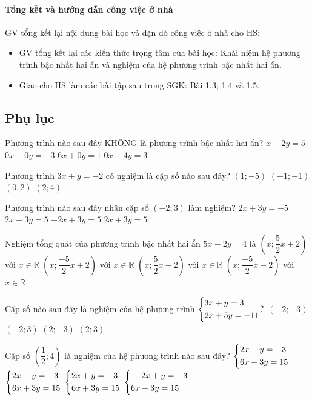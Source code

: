 \paragraph{Tổng kết và hướng dẫn công việc ở nhà}

GV tổng kết lại nội dung bài học và dặn dò công việc ở nhà cho HS:

\begin{itemize}
    \item GV tổng kết lại các kiến thức trọng tâm của bài học: Khái niệm hệ phương trình bậc nhất hai ẩn và nghiệm của hệ phương trình bậc nhất hai ẩn. 
    \item Giao cho HS làm các bài tập sau trong SGK: Bài 1.3; 1.4 và 1.5. 
\end{itemize}

\subsection{Phụ lục}

\begin{ex}
    Phương trình nào sau đây KHÔNG là phương trình bậc nhất hai ẩn?
    \choice
    {$x - 2y = 5$}
    {$0x + 0y = -3$}
    {$6x + 0y = 1$}
    {$0x - 4y = 3$}
\end{ex}

\begin{ex}
    Phương trình $3x + y = -2$ có nghiệm là cặp số nào sau đây?
    \choice
    {$(1; -5)$}
    {$(-1; -1)$}
    {$(0; 2)$}
    {$(2; 4)$}
\end{ex}

\begin{ex}
    Phương trình nào sau đây nhận cặp số $(-2; 3)$ làm nghiệm?
    \choice
    {$2x + 3y = -5$}
    {$2x - 3y = 5$}
    {$-2x + 3y = 5$}
    {$2x + 3y = 5$}
\end{ex}

\begin{ex}
    Nghiệm tổng quát của phương trình bậc nhất hai ẩn $5x - 2y = 4$ là
    \choice
    {$\left(x; \dfrac{5}{2}x + 2\right)$ với $x \in \mathbb{R}$}
    {$\left(x; \dfrac{-5}{2}x + 2\right)$ với $x \in \mathbb{R}$}
    {$\left(x; \dfrac{5}{2}x - 2\right)$ với $x \in \mathbb{R}$}
    {$\left(x; \dfrac{-5}{2}x - 2\right)$ với $x \in \mathbb{R}$}
\end{ex}

\begin{ex}
    Cặp số nào sau đây là nghiệm của hệ phương trình $\left\{\begin{aligned}&3x+y=3\\&2x+5y=-11\end{aligned}\right.?$
    \choice
    {$(-2; -3)$}
    {$(-2; 3)$}
    {$(2; -3)$}
    {$(2; 3)$}
\end{ex}

\begin{ex}
    Cặp số $\left(\dfrac{1}{2}; 4\right)$ là nghiệm của hệ phương trình nào sau đây?
    \choice
    {$\left\{\begin{aligned}&2x-y=-3\\&6x-3y=15\end{aligned}\right.$}
    {$\left\{\begin{aligned}&2x-y=-3\\&6x+3y=15\end{aligned}\right.$}
    {$\left\{\begin{aligned}&2x+y=-3\\&6x+3y=15\end{aligned}\right.$}
    {$\left\{\begin{aligned}&-2x+y=-3\\&6x+3y=15\end{aligned}\right.$}
\end{ex}